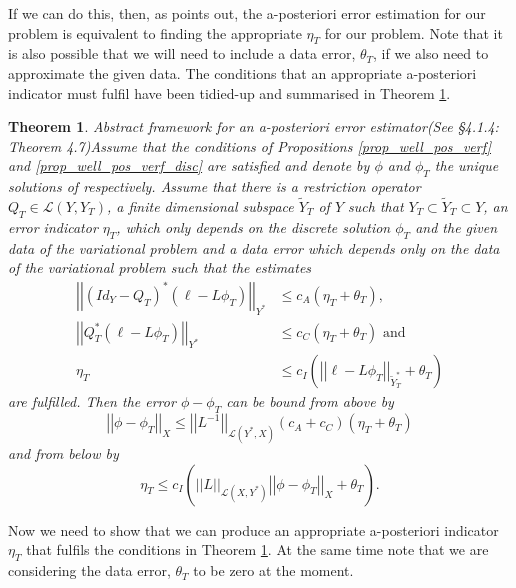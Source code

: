 \documentclass[12pt,a4paper]{article}
\newtheorem{theorem}{Theorem}[section]
\theoremstyle{definition}
\begin{document}
 
  If we can do this, then, as \cite{verfurth2013posteriori} points out, the a-posteriori error estimation for our problem is equivalent to finding the appropriate $\eta_T$ for our problem.  Note that it is also possible that we will need to include a data error, $\theta_T$, if we also need to approximate the given data.  The conditions that an appropriate a-posteriori indicator must fulfil have been tidied-up and summarised in Theorem \ref{verf_thm_apost_bounds}.
\begin{theorem}{Abstract framework for an a-posteriori error estimator}(See \cite{verfurth2013posteriori} \S4.1.4: Theorem 4.7)\label{verf_thm_apost_bounds}
Assume that the conditions of Propositions \ref{prop_well_pos_verf} and \ref{prop_well_pos_verf_disc} are satisfied and denote by $\phi$ and $\phi_T$ the unique solutions of respectively. Assume that there is a restriction operator $Q_T\in \mathcal{L}\left(Y,Y_T\right)$, a finite dimensional subspace $\widetilde{Y}_T$ of $Y$ such that $Y_T\subset\widetilde{Y}_T\subset Y$, an error indicator $\eta_T$, which only depends on the discrete solution $\phi_T$ and the given data of the variational problem and a data error which depends only on the data of the variational problem such that the estimates
\begin{equation}\nonumber
\begin{aligned}
\left|\left|\left(Id_Y-Q_T\right)^*\left(\ell -L\phi_T\right)\right|\right|_{Y^*}&\leq c_A \left(\eta_T + \theta_T\right),\\
\left|\left|Q_T^*\left(\ell -L\phi_T\right)\right|\right|_{Y^*}&\leq c_C\left(\eta_T+\theta_T\right)\text{ and}\\
\eta_T &\leq c_I\left(\left|\left|\ell - L\phi_T\right|\right|_{\widetilde{Y}^*_T}+ \theta_T\right)
\end{aligned}
\end{equation}
are fulfilled.  Then the error $\phi-\phi_T$ can be bound from above by
\begin{equation}\nonumber
\left|\left|\phi-\phi_T\right|\right|_X\leq\left|\left|L^{-1}\right|\right|_{\mathcal{L}\left(Y^*,X\right)}\left(c_A+c_C\right)\left(\eta_T+\theta_T\right)
\end{equation}
and from below by 
\begin{equation}\nonumber
\eta_T\leq c_I\left(\left|\left|L\right|\right|_{\mathcal{L}\left(X,Y^*\right)}\left|\left|\phi-\phi_T\right|\right|_X+\theta_T\right).
\end{equation}
\end{theorem}
Now we need to show that we can produce an appropriate a-posteriori indicator $\eta_T$ that fulfils the conditions in Theorem \ref{verf_thm_apost_bounds}.  At the same time note that we are considering the data error, $\theta_T$ to be zero at the moment.
\end{document}
